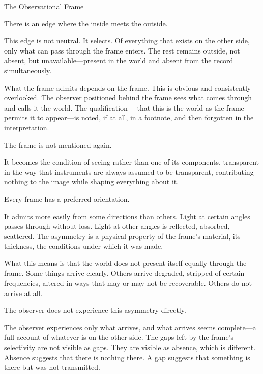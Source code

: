 
\begin{interlude}{The Observational Frame}

There is an edge where the inside meets the outside.

This edge is not neutral. It selects. Of everything that exists
on the other side, only what can pass through the frame enters.
The rest remains outside, not absent, but unavailable---present
in the world and absent from the record simultaneously.

What the frame admits depends on the frame. This is obvious and
consistently overlooked. The observer positioned behind the frame
sees what comes through and calls it the world. The qualification
---that this is the world as the frame permits it to appear---is
noted, if at all, in a footnote, and then forgotten in the
interpretation.

The frame is not mentioned again.

It becomes the condition of seeing rather than one of its
components, transparent in the way that instruments are always
assumed to be transparent, contributing nothing to the image
while shaping everything about it.

\medskip

Every frame has a preferred orientation.

It admits more easily from some directions than others. Light at
certain angles passes through without loss. Light at other angles
is reflected, absorbed, scattered. The asymmetry is a physical
property of the frame's material, its thickness, the conditions
under which it was made.

What this means is that the world does not present itself equally
through the frame. Some things arrive clearly. Others arrive
degraded, stripped of certain frequencies, altered in ways that
may or may not be recoverable. Others do not arrive at all.

The observer does not experience this asymmetry directly.

The observer experiences only what arrives, and what arrives seems
complete---a full account of whatever is on the other side. The
gaps left by the frame's selectivity are not visible as gaps.
They are visible as absence, which is different. Absence suggests
that there is nothing there. A gap suggests that something is
there but was not transmitted.


\end{interlude}
